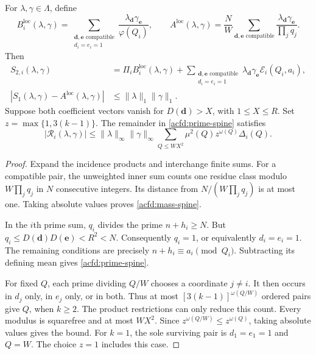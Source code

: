 \begin{theorem}\label{acfd:exact}
For $\lambda,\gamma\in\Lambda$, define
\[
 B_i^{\mathrm{loc}}(\lambda,\gamma)
   =\sum_{\substack{\boldsymbol d,\boldsymbol e\text{ compatible}\\d_i=e_i=1}}
        \frac{\lambda_{\boldsymbol d}\gamma_{\boldsymbol e}}{\varphi(Q_i)},
 \qquad
 A^{\mathrm{loc}}(\lambda,\gamma)
   =\frac NW\sum_{\boldsymbol d,\boldsymbol e\text{ compatible}}
        \frac{\lambda_{\boldsymbol d}\gamma_{\boldsymbol e}}{\prod_jq_j}.
\]
Then
\begin{align}
 S_{2,i}(\lambda,\gamma)
   &=\Pi_i B_i^{\mathrm{loc}}(\lambda,\gamma)
     +\sum_{\substack{\boldsymbol d,\boldsymbol e\text{ compatible}\\d_i=e_i=1}}
         \lambda_{\boldsymbol d}\gamma_{\boldsymbol e}
         \mathcal E_i(Q_i,a_i),\label{acfd:prime-spine}\\
 |S_1(\lambda,\gamma)-A^{\mathrm{loc}}(\lambda,\gamma)|
   &\leq\|\lambda\|_1\|\gamma\|_1.\label{acfd:mass-spine}
\end{align}
Suppose both coefficient vectors vanish for $D(\boldsymbol d)>X$, with
$1\leq X\leq R$.  Set $z=\max\{1,3(k-1)\}$.
The remainder in \eqref{acfd:prime-spine} satisfies
\begin{equation}\label{acfd:weighted-error}
 |\mathcal R_i(\lambda,\gamma)|
 \leq\|\lambda\|_\infty\|\gamma\|_\infty
      \sum_{Q\leq WX^2}\mu^2(Q)z^{\omega(Q)}\Delta_i(Q).
\end{equation}
\end{theorem}

\begin{proof}
Expand the incidence products and interchange finite sums.
For a compatible pair, the unweighted inner sum counts one residue class
modulo $W\prod_jq_j$ in $N$ consecutive integers.
Its distance from $N/(W\prod_jq_j)$ is at most one.
Taking absolute values proves \eqref{acfd:mass-spine}.

In the $i$th prime sum, $q_i$ divides the prime $n+h_i\geq N$.
But $q_i\leq D(\boldsymbol d)D(\boldsymbol e)<R^2<N$.
Consequently $q_i=1$, or equivalently $d_i=e_i=1$.
The remaining conditions are precisely $n+h_i\equiv a_i\pmod {Q_i}$.
Subtracting its defining mean gives \eqref{acfd:prime-spine}.

For fixed $Q$, each prime dividing $Q/W$ chooses a coordinate $j\ne i$.
It then occurs in $d_j$ only, in $e_j$ only, or in both.
Thus at most $[3(k-1)]^{\omega(Q/W)}$ ordered pairs give $Q$, when $k\geq2$.
The product restrictions can only reduce this count.
Every modulus is squarefree and at most $WX^2$.
Since $z^{\omega(Q/W)}\leq z^{\omega(Q)}$, taking absolute values gives the bound.
For $k=1$, the sole surviving pair is $d_1=e_1=1$ and $Q=W$.
The choice $z=1$ includes this case.
\end{proof}

